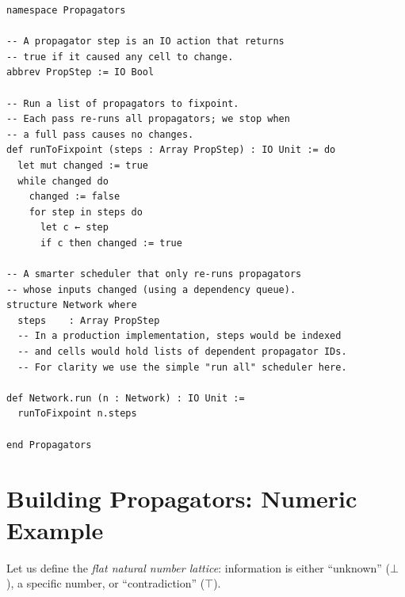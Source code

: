 \documentclass[12pt, a4paper, openright]{book}
\theoremstyle{thmstyle}
\theoremstyle{defstyle}
\begin{document}
\begin{verbatim}
namespace Propagators

-- A propagator step is an IO action that returns
-- true if it caused any cell to change.
abbrev PropStep := IO Bool

-- Run a list of propagators to fixpoint.
-- Each pass re-runs all propagators; we stop when
-- a full pass causes no changes.
def runToFixpoint (steps : Array PropStep) : IO Unit := do
  let mut changed := true
  while changed do
    changed := false
    for step in steps do
      let c ← step
      if c then changed := true

-- A smarter scheduler that only re-runs propagators
-- whose inputs changed (using a dependency queue).
structure Network where
  steps    : Array PropStep
  -- In a production implementation, steps would be indexed
  -- and cells would hold lists of dependent propagator IDs.
  -- For clarity we use the simple "run all" scheduler here.

def Network.run (n : Network) : IO Unit :=
  runToFixpoint n.steps

end Propagators
\end{verbatim}

\section{Building Propagators: Numeric Example}

Let us define the \emph{flat natural number lattice}: information is either
``unknown'' ($\bot$), a specific number, or ``contradiction'' ($\top$).
\end{document}
